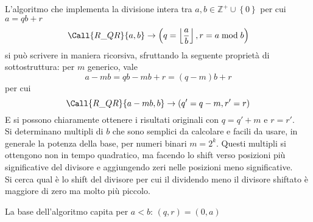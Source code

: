 L'algoritmo che implementa la divisione intera 
tra $a,b \in \mathbb{Z}^+ \cup \left\{ 0 \right\}$
per cui $
a = qb+r
$
\begin{equation*}
    \Call{R\_QR}{a,b}
    \to
    \left(
        q = \left\lfloor 
            \frac{a}{b}
        \right\rfloor
        ,
        r = a \bmod b
    \right)
\end{equation*}
si può scrivere in maniera ricorsiva, sfruttando la seguente proprietà di sottostruttura:
per $m$ generico, vale
\begin{equation*}
    a - mb
    =
    qb - mb + r
    =
    \left( q-m \right)b + r
\end{equation*}
per cui
\begin{equation*}
    \Call{R\_QR}{a-mb,b}
    \to
    \left(
        q' =
        q-m
        ,
        r' = r
    \right)
\end{equation*}
E si possono chiaramente ottenere i risultati originali con $
q = q'+m
$ e $
r = r'
$.
\\
Si determinano multipli di $b$ che sono semplici da calcolare e facili da usare, in generale la potenza della base, per numeri binari $
m = 2^k
$.
Questi multipli si ottengono non in tempo quadratico, ma facendo lo shift verso posizioni più significative del divisore e aggiungendo zeri nelle posizioni meno significative.
\\
Si cerca qual è lo shift del divisore per cui il dividendo meno il divisore shiftato è maggiore di zero ma molto più piccolo.

La base dell'algoritmo capita per $a < b$: $
\left( q, r \right) = (0, a)
$

